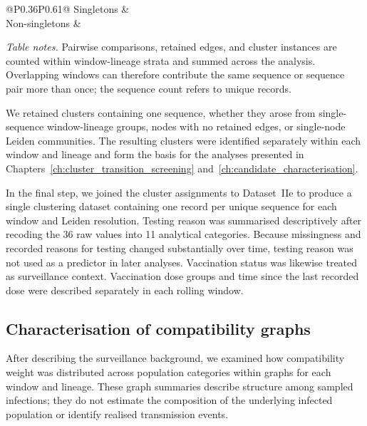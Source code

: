 \begin{table}[htbp]
\begin{thesistablebody}{@{}P{0.36\linewidth}P{0.61\linewidth}@{}}
		\quad Singletons &  \\
		\quad Non-singletons &  \\
		\bottomrule
	\end{thesistablebody}
	\par\vspace{0.4\baselineskip}
	\begin{minipage}{\linewidth}
	\footnotesize\raggedright
	\textit{Table notes.} Pairwise comparisons, retained edges, and cluster instances are counted within window-lineage strata and summed across the analysis. Overlapping windows can therefore contribute the same sequence or sequence pair more than once; the sequence count refers to unique records.
	\end{minipage}
\end{table}

We retained clusters containing one sequence, whether they arose from single-sequence window-lineage groups, nodes with no retained edges, or single-node Leiden communities. The resulting clusters were identified separately within each window and lineage and form the basis for the analyses presented in Chapters~\ref{ch:cluster_transition_screening} and~\ref{ch:candidate_characterisation}.

In the final step, we joined the cluster assignments to Dataset~IIe to produce a single clustering dataset containing one record per unique sequence for each window and Leiden resolution.
Testing reason was summarised descriptively after recoding the 36 raw values into 11 analytical categories. Because missingness and recorded reasons for testing changed substantially over time, testing reason was not used as a predictor in later analyses. Vaccination status was likewise treated as surveillance context. Vaccination dose groups and time since the last recorded dose were described separately in each rolling window.

\subsection{Characterisation of compatibility graphs}\label{sec:ch4_graph_characterisation}

After describing the surveillance background, we examined how compatibility weight was distributed across population categories within graphs for each window and lineage. These graph summaries describe structure among sampled infections; they do not estimate the composition of the underlying infected population or identify realised transmission events.

